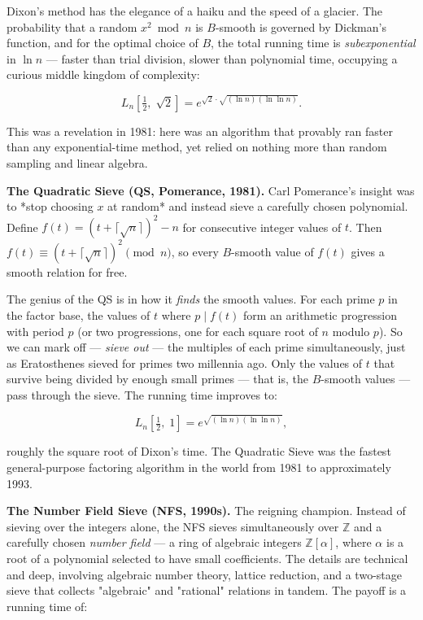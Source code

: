 Dixon's method has the elegance of a haiku and the speed of a glacier. The probability that a random $x^2 \bmod n$ is $B$-smooth is governed by Dickman's function, and for the optimal choice of $B$, the total running time is \textit{subexponential} in $\ln n$ --- faster than trial division, slower than polynomial time, occupying a curious middle kingdom of complexity:

\[
L_n\!\left[\tfrac{1}{2}, \; \sqrt{2}\right] = e^{\sqrt{2} \cdot \sqrt{(\ln n)(\ln \ln n)}}.
\]

This was a revelation in 1981: here was an algorithm that provably ran faster than any exponential-time method, yet relied on nothing more than random sampling and linear algebra.

\textbf{The Quadratic Sieve (QS, Pomerance, 1981).} Carl Pomerance's insight was to *stop choosing $x$ at random* and instead sieve a carefully chosen polynomial. Define $f(t) = (t + \lceil \sqrt{n} \rceil)^2 - n$ for consecutive integer values of $t$. Then $f(t) \equiv (t + \lceil \sqrt{n} \rceil)^2 \pmod{n}$, so every $B$-smooth value of $f(t)$ gives a smooth relation for free.

The genius of the QS is in how it \textit{finds} the smooth values. For each prime $p$ in the factor base, the values of $t$ where $p \mid f(t)$ form an arithmetic progression with period $p$ (or two progressions, one for each square root of $n$ modulo $p$). So we can mark off --- \textit{sieve out} --- the multiples of each prime simultaneously, just as Eratosthenes sieved for primes two millennia ago. Only the values of $t$ that survive being divided by enough small primes --- that is, the $B$-smooth values --- pass through the sieve. The running time improves to:

\[
L_n\!\left[\tfrac{1}{2}, \; 1\right] = e^{\sqrt{(\ln n)(\ln \ln n)}},
\]

roughly the square root of Dixon's time. The Quadratic Sieve was the fastest general-purpose factoring algorithm in the world from 1981 to approximately 1993.

\textbf{The Number Field Sieve (NFS, 1990s).} The reigning champion. Instead of sieving over the integers alone, the NFS sieves simultaneously over $\mathbb{Z}$ and a carefully chosen \textit{number field} --- a ring of algebraic integers $\mathbb{Z}[\alpha]$, where $\alpha$ is a root of a polynomial selected to have small coefficients. The details are technical and deep, involving algebraic number theory, lattice reduction, and a two-stage sieve that collects "algebraic" and "rational" relations in tandem. The payoff is a running time of:

